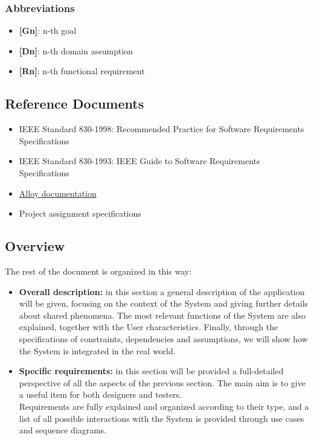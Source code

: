 \subsubsection{Abbreviations}

\begin{itemize}
		\item \textbf{[Gn]}: n-th goal
		\item \textbf{[Dn]}: n-th domain assumption
		\item \textbf{[Rn]}: n-th functional requirement
\end{itemize}

\subsection{Reference Documents}
\begin{itemize}
	\item IEEE Standard 830-1998: Recommended Practice for Software Requirements Specifications
	\item IEEE Standard 830-1993: IEEE Guide to Software Requirements Specifications
	\item \href{http://alloy.mit.edu/alloy/documentation.html}{Alloy documentation}
	\item Project assignment specifications
\end{itemize}


\subsection{Overview}
The rest of the document is organized in this way:

\begin{itemize}
	\item \textbf{Overall description:} in this section a general description of the application will be given, focusing on the context of the System and giving further details about shared phenomena. The most relevant functions of the System are also explained, together with the User characteristics. Finally, through the specifications of constraints, dependencies and assumptions, we will show how the System is integrated in the real world.
	
	\item \textbf{Specific requirements:} in this section will be provided a full-detailed perspective of all the aspects of the previous section. The main aim is to give a useful item for both designers and testers.\\
	Requirements are fully explained and organized according to their type, and a list of all possible interactions with the System is provided through use cases and sequence diagrams.
\end{itemize}
